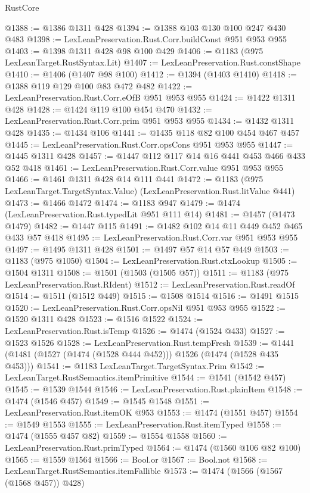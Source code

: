 \begin{lexlean}{RustCore}
\begin{coremodule}
@1388 := @1386 @1311 @428
@1394 := @1388 @103 @130 @100 @247 @430 @483
@1398 := LexLeanPreservation.Rust.Corr.buildConst @951 @953 @955
@1403 := @1398 @1311 @428 @98 @100 @429
@1406 := @1183 (@975 LexLeanTarget.RustSyntax.Lit)
@1407 := LexLeanPreservation.Rust.constShape
@1410 := @1406 (@1407 @98 @100)
@1412 := @1394 (@1403 @1410)
@1418 := @1388 @119 @129 @100 @83 @472 @482
@1422 := LexLeanPreservation.Rust.Corr.eOfB @951 @953 @955
@1424 := @1422 @1311 @428
@1428 := @1424 @119 @100 @454 @470
@1432 := LexLeanPreservation.Rust.Corr.prim @951 @953 @955
@1434 := @1432 @1311 @428
@1435 := @1434 @106
@1441 := @1435 @118 @82 @100 @454 @467 @457
@1445 := LexLeanPreservation.Rust.Corr.opsCons @951 @953 @955
@1447 := @1445 @1311 @428
@1457 := @1447 @112 @117 @14 @16 @441 @453 @466 @433 @52 @418
@1461 := LexLeanPreservation.Rust.Corr.value @951 @953 @955
@1466 := @1461 @1311 @428 @14 @111 @441
@1472 := @1183 (@975 LexLeanTarget.TargetSyntax.Value) (LexLeanPreservation.Rust.litValue @441)
@1473 := @1466 @1472
@1474 := @1183 @947
@1479 := @1474 (LexLeanPreservation.Rust.typedLit @951 @111 @14)
@1481 := @1457 (@1473 @1479)
@1482 := @1447 @115
@1491 := @1482 @102 @14 @11 @449 @452 @465 @433 @57 @418
@1495 := LexLeanPreservation.Rust.Corr.var @951 @953 @955
@1497 := @1495 @1311 @428
@1501 := @1497 @57 @14 @57 @449
@1503 := @1183 (@975 @1050)
@1504 := LexLeanPreservation.Rust.ctxLookup
@1505 := @1504 @1311
@1508 := @1501 (@1503 (@1505 @57))
@1511 := @1183 (@975 LexLeanPreservation.Rust.RIdent)
@1512 := LexLeanPreservation.Rust.readOf
@1514 := @1511 (@1512 @449)
@1515 := @1508 @1514
@1516 := @1491 @1515
@1520 := LexLeanPreservation.Rust.Corr.opsNil @951 @953 @955
@1522 := @1520 @1311 @428
@1523 := @1516 @1522
@1524 := LexLeanPreservation.Rust.isTemp
@1526 := @1474 (@1524 @433)
@1527 := @1523 @1526
@1528 := LexLeanPreservation.Rust.tempFresh
@1539 := @1441 (@1481 (@1527 (@1474 (@1528 @444 @452))) @1526 (@1474 (@1528 @435 @453)))
@1541 := @1183 LexLeanTarget.TargetSyntax.Prim
@1542 := LexLeanTarget.RustSemantics.itemPrimitive
@1544 := @1541 (@1542 @457)
@1545 := @1539 @1544
@1546 := LexLeanPreservation.Rust.plainItem
@1548 := @1474 (@1546 @457)
@1549 := @1545 @1548
@1551 := LexLeanPreservation.Rust.itemOK @953
@1553 := @1474 (@1551 @457)
@1554 := @1549 @1553
@1555 := LexLeanPreservation.Rust.itemTyped
@1558 := @1474 (@1555 @457 @82)
@1559 := @1554 @1558
@1560 := LexLeanPreservation.Rust.primTyped
@1564 := @1474 (@1560 @106 @82 @100)
@1565 := @1559 @1564
@1566 := Bool.or
@1567 := Bool.not
@1568 := LexLeanTarget.RustSemantics.itemFallible
@1573 := @1474 (@1566 (@1567 (@1568 @457)) @428)

\end{coremodule}
\end{lexlean}
